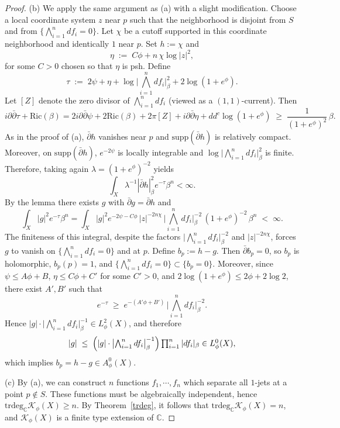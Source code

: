 \documentclass[10pt,a4paper]{amsart}
\newcommand{\Ric}{\mathrm{Ric}}
\newcommand{\cK}{\mathcal{K}}
\newcommand{\idd}{i\partial\bar\partial}
\newcommand{\supp}{\mathrm{supp}}
\newcommand{\trdeg}{\mathrm{trdeg}}
\begin{document}
\begin{proof}
\medskip
\noindent (b)
We apply the same argument as (a) with a slight modification.
Choose a local coordinate system $z$ near $p$ such that the neighborhood is disjoint from
$S$ and from $\{\bigwedge_{i=1}^n df_i=0\}$.
Let $\chi$ be a cutoff supported in this coordinate neighborhood and identically $1$ near $p$.
Set $h:=\chi$ and
\[
\eta \;:=\; C\phi + n\,\chi \log|z|^2,
\]
for some $C>0$ chosen so that $\eta$ is psh.
Define
\[
\tau \;:=\; 2\psi+\eta+\log\bigl|\textstyle\bigwedge_{i=1}^n df_i\bigr|_\beta^2 + 2\log(1+e^\phi).
\]
Let $[Z]$ denote the zero divisor of $\bigwedge_{i=1}^n df_i$ (viewed as a $(1,1)$-current).
Then
\[
\idd\tau+\Ric(\beta)
=2\idd\psi+2\Ric(\beta)+2\pi[Z]+\idd\eta+dd^c\log(1+e^\phi)
\;\ge\;\frac{1}{(1+e^\phi)^2}\,\beta.
\]
As in the proof of (a), $\bar\partial h$ vanishes near $p$ and $\supp(\bar\partial h)$ is relatively compact. Moreover, on $\supp(\bar\partial h)$, $e^{-2\psi}$ is locally integrable and $\log\bigl|\textstyle\bigwedge_{i=1}^n df_i\bigr|_\beta^2$ is finite.  Therefore, taking again $\lambda=(1+e^\phi)^{-2}$ yields
\[
\int_X \lambda^{-1}|\bar\partial h|_\beta^2 e^{-\tau}\beta^n<\infty.
\]
By the lemma there exists $g$ with $\bar\partial g=\bar\partial h$ and
\[
\int_X |g|^2 e^{-\tau}\beta^n
=\int_X |g|^2 e^{-2\psi-C\phi}\,|z|^{-2n\chi}\,
\bigl|\textstyle\bigwedge_{i=1}^n df_i\bigr|_\beta^{-2}\,(1+e^\phi)^{-2}\,\beta^n
\;<\;\infty.
\]
The finiteness of this integral, despite the factors
$\bigl|\bigwedge_{i=1}^n df_i\bigr|_\beta^{-2}$ and $|z|^{-2n\chi}$, forces $g$ to vanish on
$\{\bigwedge_{i=1}^n df_i=0\}$ and at $p$.
Define $b_p:=h-g$. Then $\bar\partial b_p=0$, so $b_p$ is holomorphic, $b_p(p)=1$, and
$\{\bigwedge_{i=1}^n df_i=0\}\subset\{b_p=0\}$.
Moreover, since $\psi\le A\phi+B$, $\eta\le C\phi+C'$ for some $C'>0$, and
$2\log(1+e^\phi)\le 2\phi+2\log 2$, there exist $A',B'$ such that
\[
e^{-\tau}\;\ge\; e^{-(A'\phi+B')}\,\bigl|\textstyle\bigwedge_{i=1}^n df_i\bigr|_\beta^{-2}.
\]
Hence $|g|\cdot\bigl|\bigwedge_{i=1}^n df_i\bigr|_\beta^{-1}\in L_\phi^2(X)$, and therefore
\[
|g|\;\le\;\Bigl(|g|\cdot\bigl|\textstyle\bigwedge_{i=1}^n df_i\bigr|_\beta^{-1}\Bigr)
\prod_{i=1}^n |df_i|_\beta \in L_\phi^0(X),
\]
which implies $b_p=h-g\in A_\phi^0(X)$.

\medskip
\noindent (c)
By (a), we can construct $n$ functions $f_1, \cdots, f_n$ which separate all $1$-jets at a point $p\notin S$. These functions must be algebraically independent, hence $\trdeg_{\mathbb{C}} \cK_\phi(X) \ge n$. By Theorem~\ref{trdeg}, it follows that $\trdeg_{\mathbb{C}} \cK_\phi(X) = n$, and $\cK_\phi(X)$ is a finite type extension of $\mathbb{C}$.
\end{proof}
\end{document}

